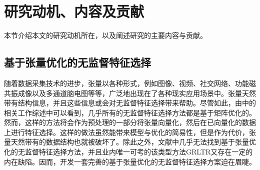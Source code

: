 
\section{研究动机、内容及贡献}\label{sec:motivation}
本节介绍本文的研究动机所在，以及阐述研究的主要内容与贡献。
\subsection{基于张量优化的无监督特征选择}\label{sec:motiv-ufs}
随着数据采集技术的进步，张量以各种形式，例如图像、视频、社交网络、功能磁共振成像以及多通道脑电图等等，广泛地出现在了各种现实应用场景中。张量天然带有结构信息，并且这些信息或会对无监督特征选择带来帮助。尽管如此，由中的相关工作综述中可以看到，几乎所有的无监督特征选择方法都是基于矩阵优化的。然而，这样的方法将会作为预处理的一部分将张量向量化，然后在已向量化的数据上进行特征选择。这样的做法虽然能带来模型与优化的简易性，但是作为代价，张量天然带有的数据结构也就被破坏了。除此之外，文献中几乎无法找到基于张量优化的无监督特征选择方法，并且业内唯一可考的该类型方法GRLTR又存在一定的内在缺陷。因而，开发一套完善的基于张量优化的无监督特征选择方案迫在眉睫。


